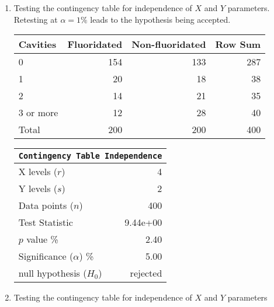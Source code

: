 \begin{enumerate}
\begin{table}[H]
	\end{table}
	\bigskip
	
	\item Testing the contingency table for independence of $ X $ and $ Y $ parameters. Retesting at $ \alpha = 1\% $ leads to the hypothesis being accepted.
	
	\begin{table}[H]
		\centering
		\begin{tabular}{lrrr}
			\toprule
			Cavities &   Fluoridated &   Non-fluoridated &  Row Sum \\
			\midrule
			0         &                154 &                   133 &      287 \\
			1         &                 20 &                    18 &       38 \\
			2         &                 14 &                    21 &       35 \\
			3 or more &                 12 &                    28 &       40 \\
			\midrule
			Total     &                200 &                   200 &      400 \\
			\bottomrule
		\end{tabular}
		
	\end{table}
	\bigskip
	\begin{table}[H]
		\centering
		\begin{tabular}{@{}lr@{}}
			\toprule
			\multicolumn{2}{c}{\texttt{Contingency Table Independence}} \\
			\midrule
			X levels ($r$)             &         4 \\
			Y levels ($s$)             &         2 \\
			Data points ($n$)          &       400 \\
			Test Statistic             &  9.44e+00 \\
			$p$ value \%               &      2.40 \\
			Significance ($\alpha$) \% &      5.00 \\
			null hypothesis ($H_0$)    &  rejected \\
			\bottomrule
		\end{tabular}
		
	\end{table}
	\bigskip
	
	\item Testing the contingency table for independence of $ X $ and $ Y $ parameters \\
	

\end{enumerate}

